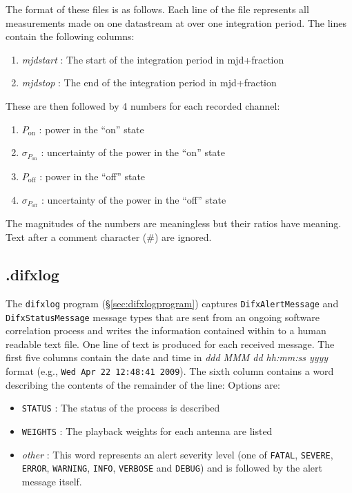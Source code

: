 The format of these files is as follows.
Each line of the file represents all measurements made on one datastream at over one integration period.
The lines contain the following columns:
\begin{enumerate}
\item {\em mjdstart} : The start of the integration period in mjd+fraction
\item {\em mjdstop} : The end of the integration period in mjd+fraction
\end{enumerate}
These are then followed by 4 numbers for each recorded channel:
\begin{enumerate}
\item $P_\mathrm{on}$ : power in the ``on'' state
\item $\sigma_{P_\mathrm{on}}$ : uncertainty of the power in the ``on'' state
\item $P_\mathrm{off}$ : power in the ``off'' state
\item $\sigma_{P_\mathrm{off}}$ : uncertainty of the power in the ``off'' state
\end{enumerate}
The magnitudes of the numbers are meaningless but their ratios have meaning.
Text after a comment character (\#) are ignored.






\subsection{.difxlog} \label{sec:dotdifxlog}

The {\tt difxlog} program (\S\ref{sec:difxlogprogram}) captures {\tt DifxAlertMessage} and {\tt DifxStatusMessage} message types that are sent from an ongoing software correlation process and writes the information contained within to a human readable text file.
One line of text is produced for each received message.
The first five columns contain the date and time in {\em ddd MMM dd hh:mm:ss yyyy} format (e.g., {\tt Wed Apr 22 12:48:41 2009}).
The sixth column contains a word describing the contents of the remainder of the line:  Options are:
\begin{itemize}
\item[] {\tt STATUS} : The status of the process is described
\item[] {\tt WEIGHTS} : The playback weights for each antenna are listed
\item[] {\em other} : This word represents an alert severity level (one of {\tt FATAL}, {\tt SEVERE}, {\tt ERROR}, {\tt WARNING}, {\tt INFO}, {\tt VERBOSE} and {\tt DEBUG}) and is followed by the alert message itself.
\end{itemize}





